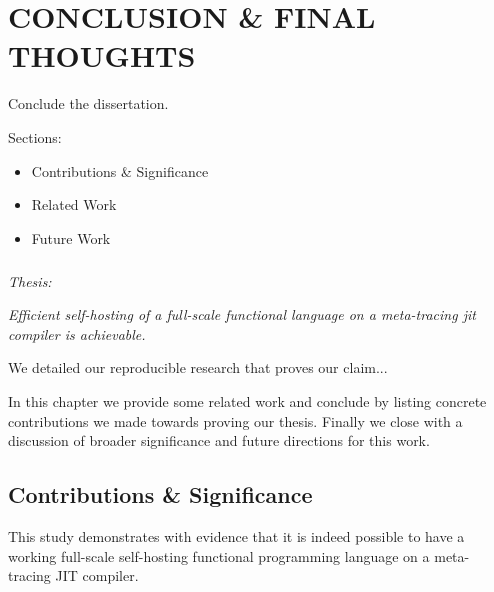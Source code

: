 \chapter[\texorpdfstring{CONCLUSION \& FINAL THOUGHTS}
                          {8. Conclusion}]{CONCLUSION \& FINAL THOUGHTS}

    \label{chapter:conclusion}

    \begin{chaptersynopsis}
        Conclude the dissertation.

        \vspace{2em}

        Sections:
		\begin{itemize}
            \item Contributions \& Significance
			\item Related Work
			\item Future Work
		\end{itemize}
    \end{chaptersynopsis}

    \paragraph{} \textit{Thesis:}

    \textit{Efficient self-hosting of a full-scale functional language on a meta-tracing \gls{jit} compiler is achievable.}

    \begin{paragraph-here}%
        We detailed our reproducible research that proves our claim...
    \end{paragraph-here}

    \begin{paragraph-here}%
        In this chapter we provide some related work and conclude by listing concrete contributions we made towards proving our thesis. Finally we close with a discussion of broader significance and future directions for this work.
    \end{paragraph-here}

    \section[\texorpdfstring{Contributions \& Significance}{Significance}]{Contributions \& Significance}
        \begin{paragraph-here}%
            This study demonstrates with evidence that it is indeed possible to have a working full-scale self-hosting functional programming language on a meta-tracing JIT compiler.
        \end{paragraph-here}

